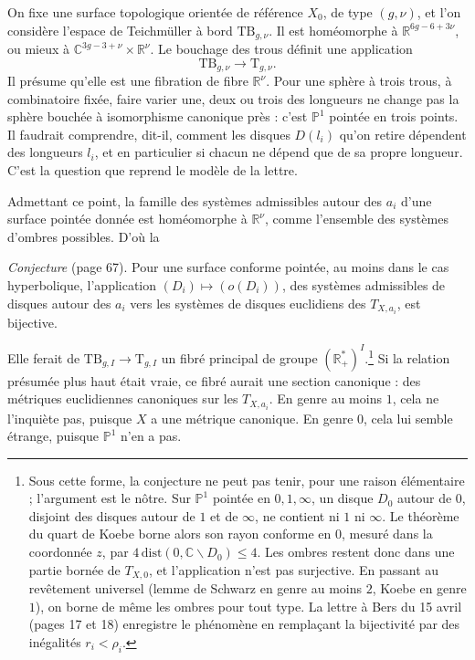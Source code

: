 \documentclass[11pt,a4paper]{article}
\begin{document}
On fixe une surface topologique orientée de référence $X_0$, de type
$(g,\nu)$, et l'on considère l'espace de Teichmüller à bord
$\mathrm{TB}_{g,\nu}$. Il est homéomorphe à $\mathbb{R}^{6g-6+3\nu}$, ou
mieux à $\mathbb{C}^{3g-3+\nu} \times \mathbb{R}^{\nu}$. Le bouchage des
trous définit une application
\[
\mathrm{TB}_{g,\nu} \longrightarrow \mathrm{T}_{g,\nu}.
\]
Il présume qu'elle est une fibration de fibre $\mathbb{R}^{\nu}$. Pour une
sphère à trois trous, à combinatoire fixée, faire varier une, deux ou trois
des longueurs ne change pas la sphère bouchée à isomorphisme canonique près :
c'est $\mathbb{P}^{1}$ pointée en trois points. Il faudrait comprendre, dit-il,
comment les disques $D(l_i)$ qu'on retire dépendent des longueurs $l_i$, et en
particulier si chacun ne dépend que de sa propre longueur. C'est la question
que reprend le modèle de la lettre.

Admettant ce point, la famille des systèmes admissibles autour des $a_i$ d'une
surface pointée donnée est homéomorphe à $\mathbb{R}^{\nu}$, comme l'ensemble
des systèmes d'ombres possibles. D'où la

\emph{Conjecture} (page 67). Pour une surface conforme pointée, au moins dans
le cas hyperbolique, l'application $(D_i) \mapsto (o(D_i))$, des systèmes
admissibles de disques autour des $a_i$ vers les systèmes de disques
euclidiens des $T_{X,a_i}$, est bijective.

Elle ferait de $\mathrm{TB}_{g,I} \to \mathrm{T}_{g,I}$ un fibré principal
de groupe $(\mathbb{R}^{*}_{+})^{I}$.\footnote{Sous cette forme, la
conjecture ne peut pas tenir, pour une raison élémentaire ; l'argument est le
nôtre. Sur $\mathbb{P}^{1}$ pointée en $0, 1, \infty$, un disque $D_0$ autour
de $0$, disjoint des disques autour de $1$ et de $\infty$, ne contient ni $1$
ni $\infty$. Le théorème du quart de Koebe borne alors son rayon conforme en
$0$, mesuré dans la coordonnée $z$, par $4\,\mathrm{dist}(0, \mathbb{C}
\smallsetminus D_0) \leqslant 4$. Les ombres restent donc dans une partie
bornée de $T_{X,0}$, et l'application n'est pas surjective. En passant au
revêtement universel (lemme de Schwarz en genre au moins $2$, Koebe en genre
$1$), on borne de même les ombres pour tout type. La lettre à Bers du 15 avril
(pages 17 et 18) enregistre le phénomène en remplaçant la bijectivité par des
inégalités $r_i < \rho_i$.} Si la relation présumée plus haut était vraie, ce
fibré aurait une section canonique : des métriques euclidiennes canoniques sur
les $T_{X,a_i}$. En genre au moins $1$, cela ne l'inquiète pas, puisque $X$ a
une métrique canonique. En genre $0$, cela lui semble étrange, puisque
$\mathbb{P}^{1}$ n'en a pas.
\end{document}
